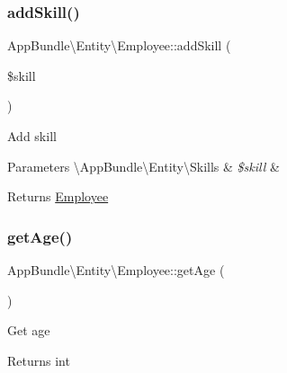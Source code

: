 \subsubsection{\texorpdfstring{add\+Skill()}{addSkill()}}
{\footnotesize\ttfamily App\+Bundle\textbackslash{}\+Entity\textbackslash{}\+Employee\+::add\+Skill (\begin{DoxyParamCaption}\item[{\textbackslash{}App\+Bundle\textbackslash{}\+Entity\textbackslash{}\+Skills}]{\$skill }\end{DoxyParamCaption})}

Add skill


\begin{DoxyParams}[1]{Parameters}
\textbackslash{}\+App\+Bundle\textbackslash{}\+Entity\textbackslash{}\+Skills & {\em \$skill} & \\
\hline
\end{DoxyParams}
\begin{DoxyReturn}{Returns}
\mbox{\hyperlink{class_app_bundle_1_1_entity_1_1_employee}{Employee}} 
\end{DoxyReturn}
\mbox{\label{class_app_bundle_1_1_entity_1_1_employee_aa2f51fb4f112bb2b96f58d4d13f2d556}} 
\subsubsection{\texorpdfstring{get\+Age()}{getAge()}}
{\footnotesize\ttfamily App\+Bundle\textbackslash{}\+Entity\textbackslash{}\+Employee\+::get\+Age (\begin{DoxyParamCaption}{ }\end{DoxyParamCaption})}

Get age

\begin{DoxyReturn}{Returns}
int 
\end{DoxyReturn}
\mbox{\label{class_app_bundle_1_1_entity_1_1_employee_a1eefb3ea4030d24b24ad529f4a20de21}} 
